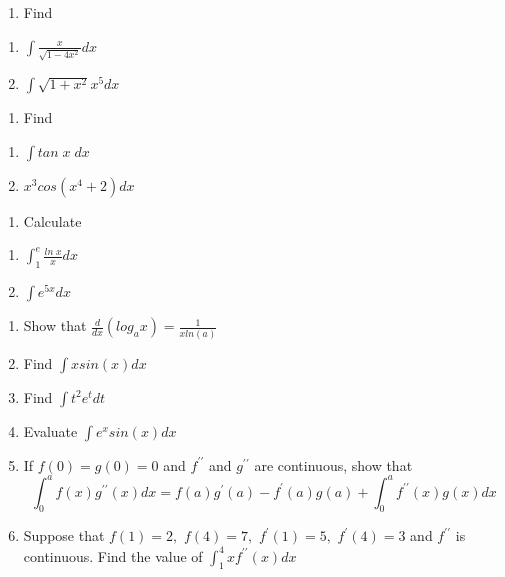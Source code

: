 \documentclass[]{book}
\providecommand{\tightlist}{%
  \setlength{\itemsep}{0pt}\setlength{\parskip}{0pt}}
\begin{document}
\begin{enumerate}
\def\labelenumi{\arabic{enumi}.}
\setcounter{enumi}{31}
\tightlist
\item
  Find\\
\end{enumerate}

\begin{enumerate}
\def\labelenumi{(\alph{enumi})}
\tightlist
\item
  \(\int\frac{x}{\sqrt{1-4x^2}}dx\)
\item
  \(\int \sqrt{1+x^2} x^5dx\)
\end{enumerate}

\begin{enumerate}
\def\labelenumi{\arabic{enumi}.}
\setcounter{enumi}{32}
\tightlist
\item
  Find
\end{enumerate}

\begin{enumerate}
\def\labelenumi{(\alph{enumi})}
\tightlist
\item
  \(\int tan\;x \;dx\)
\item
  \(x^3 cos (x^4 +2) dx\)
\end{enumerate}

\begin{enumerate}
\def\labelenumi{\arabic{enumi}.}
\setcounter{enumi}{33}
\tightlist
\item
  Calculate
\end{enumerate}

\begin{enumerate}
\def\labelenumi{(\alph{enumi})}
\tightlist
\item
  \(\int_1^e\frac{ln\;x}{x}dx\)
\item
  \(\int e^{5x} dx\)
\end{enumerate}

\begin{enumerate}
\def\labelenumi{\arabic{enumi}.}
\setcounter{enumi}{34}
\item
  Show that \(\frac{d}{dx}(log_ax) = \frac{1}{xln(a)}\)
\item
  Find \(\int xsin(x)dx\)
\item
  Find \(\int t^2e^tdt\)
\item
  Evaluate \(\int e^xsin (x)dx\)
\item
  If \(f(0) = g(0)=0\) and \(f^{\prime\prime}\) and \(g^{\prime\prime}\) are continuous, show that
  \[\int_0^af(x)g^{\prime\prime}(x)dx=f(a)g^{\prime}(a)-f^{\prime}(a)g(a)+\int_0^af^{\prime\prime}(x)g(x)dx\]
\item
  Suppose that \(f(1)=2,\) \(f(4)=7,\) \(f^{\prime}(1)=5,\) \(f^{\prime}(4)=3\) and \(f^{\prime\prime}\) is continuous. Find the value of \(\int_1^4xf^{\prime\prime}(x)dx\)
\end{enumerate}
\end{document}

